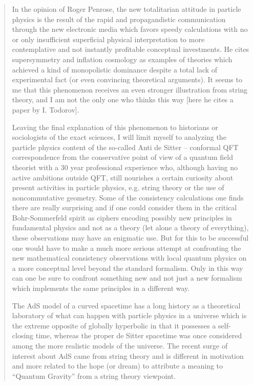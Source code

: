 \documentclass{article}
\begin{document}
\begin{quote}
In the opinion of Roger Penrose, the new totalitarian attitude in
particle physics is the result of the rapid and propagandistic
communication through the new electronic media which favors speedy
calculations with no or only insufficient superficial physical
interpretation to more contemplative and not instantly profitable
conceptual investments. He cites supersymmetry and inflation cosmology
as examples of theories which achieved a kind of monopolistic dominance
despite a total lack of experimental fact (or even convincing
theoretical arguments). It seems to me that this phenomenon receives an
even stronger illustration from string theory, and I am not the only one
who thinks this way {[}here he cites a paper by I. Todorov{]}.

Leaving the final explanation of this phenomenon to historians or
sociologists of the exact sciences, I will limit myself to analyzing the
particle physics content of the so-called Anti de Sitter -- conformal
QFT correspondence from the conservative point of view of a quantum
field theorist with a 30 year professional experience who, although
having no active ambitions outside QFT, still nourishes a certain
curiosity about present activities in particle physics, e.g. string
theory or the use of noncommutative geometry. Some of the consistency
calculations one finds there are really surprising and if one could
consider them in the critical Bohr-Sommerfeld spirit as ciphers encoding
possibly new principles in fundamental physics and not as a theory (let
alone a theory of everything), these observations may have an enigmatic
use. But for this to be successful one would have to make a much more
serious attempt at confronting the new mathematical consistency
observations with local quantum physics on a more conceptual level
beyond the standard formalism. Only in this way can one be sure to
confront something new and not just a new formalism which implements the
same principles in a different way.

The AdS model of a curved spacetime has a long history as a theoretical
laboratory of what can happen with particle physics in a universe which
is the extreme opposite of globally hyperbolic in that it possesses a
self-closing time, whereas the proper de Sitter spacetime was once
considered among the more realistic models of the universe. The recent
surge of interest about AdS came from string theory and is different in
motivation and more related to the hope (or dream) to attribute a
meaning to ``Quantum Gravity'' from a string theory viewpoint.


\end{quote}
\end{document}
